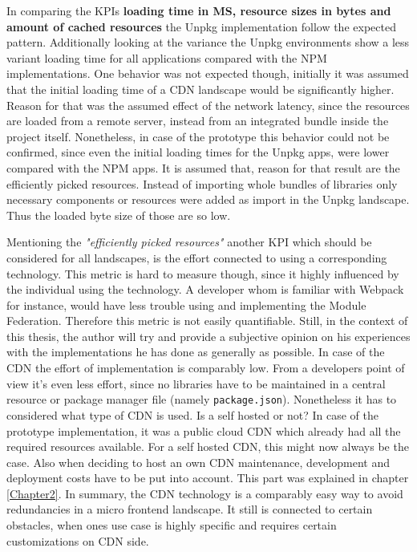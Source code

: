 In comparing the KPIs \textbf{loading time in MS, resource sizes in bytes and amount of cached resources} the Unpkg implementation follow the expected pattern. Additionally looking at the variance the Unpkg environments show a less variant loading time for all applications compared with the NPM implementations. 
One behavior was not expected though, initially it was assumed that the initial loading time of a CDN landscape would be significantly higher. Reason for that was the assumed effect of the network latency, since the resources are loaded from a remote server, instead from an integrated bundle inside the project itself. Nonetheless, in case of the prototype this behavior could not be confirmed, since even the initial loading times for the Unpkg apps, were lower compared with the NPM apps. It is assumed that, reason for that result are the efficiently picked resources. Instead of importing whole bundles of libraries only necessary components or resources were added as import in the Unpkg landscape. Thus the loaded byte size of those are so low.

Mentioning the \textit{"efficiently picked resources"} another KPI which should be considered for all landscapes, is the effort connected to using a corresponding technology. This metric is hard to measure though, since it highly influenced by the individual using the technology. A developer whom is familiar with Webpack for instance, would have less trouble using and implementing the Module Federation. Therefore this metric is not easily quantifiable. Still, in the context of this thesis, the author will try and provide a subjective opinion on his experiences with the implementations he has done as generally as possible. 
In case of the CDN the effort of implementation is comparably low. From a developers point of view it's even less effort, since no libraries have to be maintained in a central resource or package manager file (namely \texttt{package.json}). Nonetheless it has to considered what type of CDN is used. Is a self hosted or not? 
In case of the prototype implementation, it was a public cloud CDN which already had all the required resources available. For a self hosted CDN, this might now always be the case. Also when deciding to host an own CDN maintenance, development and deployment costs have to be put into account. This part was explained in chapter \ref{Chapter2}.
In summary, the CDN technology is a comparably easy way to avoid redundancies in a micro frontend landscape. It still is connected to certain obstacles, when ones use case is highly specific and requires certain customizations on CDN side. 

